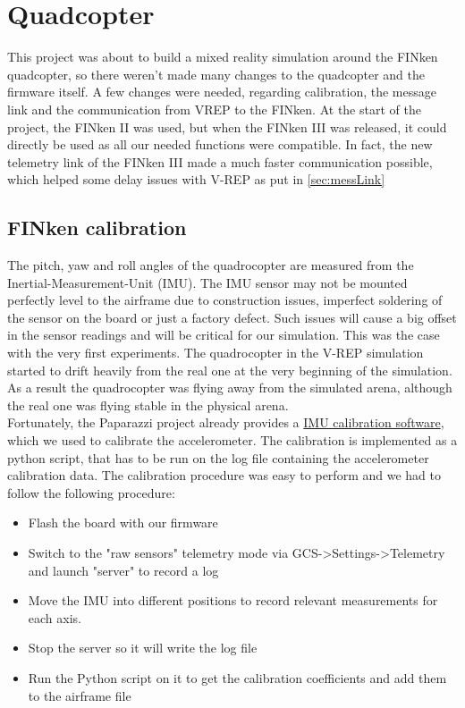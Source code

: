 \section{Quadcopter}

This project was about to build a mixed reality simulation around the FINken quadcopter, so there weren't made many changes to the quadcopter and the firmware itself. A few changes were needed, regarding calibration, the message link and the communication from VREP to the FINken. At the start of the project, the FINken II was used, but when the FINken III was released, it could directly be used as all our needed functions were compatible. In fact, the new telemetry link of the FINken III made a much faster communication possible, which helped some delay issues with V-REP as put in \ref{sec:messLink}
\subsection{FINken calibration}

The pitch, yaw and roll angles of the quadrocopter are measured from the Inertial-Measurement-Unit (IMU). The IMU sensor may not be mounted perfectly level to the airframe due to construction issues, imperfect soldering of the sensor on the board or just a factory defect. Such issues will cause a big offset in the sensor readings and will be critical for our simulation.
This was the case with the very first experiments. The quadrocopter in the V-REP simulation started to drift heavily from the real one at the very beginning of the simulation. As a result the quadrocopter was flying away from the simulated arena, although the real one was flying stable in the physical arena.\\
Fortunately, the Paparazzi project already provides a \href{http://wiki.paparazziuav.org/wiki/ImuCalibration}{IMU calibration software}, which we used to calibrate the accelerometer. The calibration is implemented as a python script, that has to be run on the log file containing the accelerometer calibration data. The calibration procedure was easy to perform and we had to follow the following procedure:

\begin{itemize}
\item{Flash the board with our firmware}
\item{Switch to the "raw sensors" telemetry mode via GCS->Settings->Telemetry and launch "server" to record a log}
\item{Move the IMU into different positions to record relevant measurements for each axis. }
\item{Stop the server so it will write the log file}
\item{Run the Python script on it to get the calibration coefficients and add them to the airframe file}
\end{itemize}


